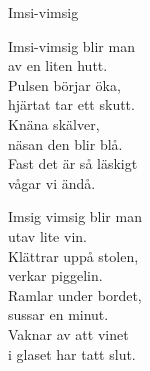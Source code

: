 \begin{song}{Imsi-vimsig}
	
	
	
	Imsi-vimsig blir man\\
	av en liten hutt.\\
	Pulsen börjar öka,\\
	hjärtat tar ett skutt.\\
	Knäna skälver,\\			%
	näsan den blir blå.\\
	Fast det är så läskigt\\
	vågar vi ändå.
	
	Imsig vimsig blir man\\
	utav lite vin.\\
	Klättrar uppå stolen,\\
	verkar piggelin.\\
	Ramlar under bordet,\\
	sussar en minut.\\
	Vaknar av att vinet\\
	i glaset har tatt slut.
	
\end{song}
